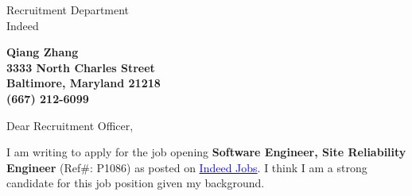 \documentclass[11pt]{letter} %
\begin{document}

\begin{letter}{Recruitment Department \\
Indeed} 


\begin{center}
\large\bf Qiang Zhang \\ %
3333 North Charles Street \\ Baltimore, Maryland 21218 \\ (667) 212-6099 %
\end{center} 
\vfill

\signature{Qiang Zhang} %


\opening{Dear Recruitment Officer,} 
 

I am writing to apply for the job opening \textbf{Software Engineer, Site Reliability Engineer} (Ref\#: P1086) as posted on \href{https://www.indeed.jobs/career/JobDetail/Software-Engineer-Site-Reliability-Engineer/6620}{\textcolor{blue}{Indeed Jobs}}. I think I am a strong candidate for this job position given my background.



\end{letter}
\end{document}
